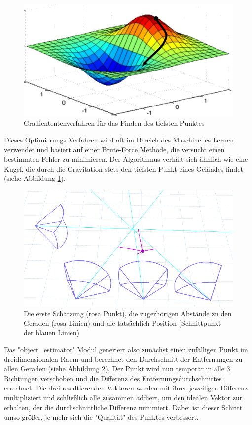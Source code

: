 \documentclass[12pt, ngerman]{article}
\begin{document}
\begin{figure}
  {\setlength{\belowcaptionskip}{-20pt}
    \includegraphics[width=\linewidth]{gradient_descent.png}
    \caption{Gradiententenverfahren für das Finden des tiefsten Punktes}
    \label{Abb: gradient_descent}
  }
\end{figure}
Dieses Optimierungs-Verfahren wird oft im Bereich des Maschinelles Lernen verwendet und basiert auf einer Brute-Force Methode, die versucht einen bestimmten Fehler zu minimieren. Der Algorithmus verhält sich ähnlich wie eine Kugel, die durch die Gravitation stets den tiefsten Punkt eines Geländes findet (siehe Abbildung \ref{Abb: gradient_descent}).

\begin{figure}
  \includegraphics[width=\linewidth]{distance.png}
  \caption{Die erste Schätzung (rosa Punkt), die zugerhörigen Abstände zu den Geraden (rosa Linien) und die tatsächlich Position (Schnittpunkt der blauen Linien)}
  \label{Abb: distance}
\end{figure}
Das "object\_estimator" Modul generiert also zu\-nächst einen zufälligen Punkt im dreidimensionalen Raum und berechnet den Durchschnitt der Entfernungen zu allen Geraden (siehe Abbildung \ref{Abb: distance}). Der Punkt wird nun temporär in alle 3 Richtungen verschoben und die Differenz des Entfernungsdurchschnittes errechnet. Die drei resultierenden Vektoren werden mit ihrer jeweiligen Differenz multipliziert und schließlich alle zusammen addiert, um den idealen Vektor zur erhalten, der die durchschnittliche Differenz minimiert. Dabei ist dieser Schritt umso größer, je mehr sich die "Qualität" des Punktes verbessert. 
\end{document}

